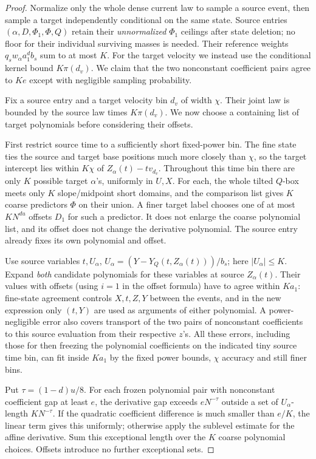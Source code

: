 \begin{proof}
Normalize only the whole dense current law to sample a source
event, then sample a target independently conditional on the same
state. Source entries \((\alpha,D,\Phi_1,\Phi,Q)\) retain their
\emph{unnormalized} \(\Phi_1\) ceilings after state deletion;
no floor for their individual surviving masses is needed. Their
reference weights \(q_sw_\alpha a_1^db_s\) sum to at most \(K\).
For the target velocity we instead use the conditional kernel bound
\(K\pi(d_v)\). We claim that the two nonconstant coefficient
pairs agree to \(Ke\) except with negligible sampling probability.

Fix a source entry and a target velocity bin \(d_v\) of width
\(\chi\).  Their joint law is bounded by the source law times
\(K\pi(d_v)\).  We now choose a containing list of target
polynomials before considering their offsets.

First restrict source time to a sufficiently short fixed-power bin.
The fine state ties the source and target base positions much more
closely than \(\chi\), so the target intercept lies within
\(K\chi\) of \(Z_\alpha(t)-tv_{d_v}\).  Throughout this time
bin there are only \(K\) possible target \(\alpha\)'s,
uniformly in \(U,X\).  For each, the whole tilted \(Q\)-box
meets only \(K\) slope/midpoint short domains, and the comparison
list gives \(K\) coarse predictors \(\Phi\) on their union.
A finer target label chooses one of at most \(KN^{du}\) offsets
\(D_1\) for such a predictor.  It does not enlarge the coarse
polynomial list, and its offset does not change the derivative
polynomial.  The source entry already fixes its own polynomial and
offset.

Use source variables \(t,U_\alpha\), \(U_\alpha=(Y-Y_Q(t,Z_\alpha(t)))/b_s\); here \(|U_\alpha|\le K\). Expand \emph{both} candidate polynomials for these variables at source \(Z_\alpha(t)\). Their values with offsets (using \(i=1\) in the offset formula) have to agree within \(K a_1\): fine-state agreement controls \(X,t,Z,Y\) between the events, and in the new expression only \((t,Y)\) are used as arguments of either polynomial. A power-negligible error also covers transport of the two pairs of nonconstant coefficients to this source evaluation from their respective \(z\)'s. All these errors, including those for then freezing the polynomial coefficients on the indicated tiny source time bin, can fit inside \(K a_1\) by the fixed power bounds, \(\chi\) accuracy and still finer bins.

Put \(\tau=(1-d)u/8\).  For each frozen polynomial pair with
nonconstant coefficient gap at least \(e\), the derivative gap
exceeds \(eN^{-\tau}\) outside a set of \(U_\alpha\)-length
\(KN^{-\tau}\).  If the quadratic coefficient difference is
much smaller than \(e/K\), the linear term gives this uniformly;
otherwise apply the sublevel estimate for the affine derivative.
Sum this exceptional length over the \(K\) coarse polynomial
choices.  Offsets introduce no further exceptional sets.


\end{proof}
